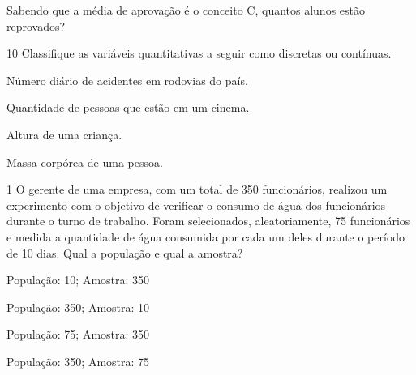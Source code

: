 {\begin{escolha}
\item
  Sabendo que a média de aprovação é o conceito C, quantos alunos estão
  reprovados?

\end{escolha}


\num{10} Classifique as variáveis quantitativas a seguir como discretas
ou contínuas.


\begin{escolha}
\item
  Número diário de acidentes em rodovias do país.


\item
  Quantidade de pessoas que estão em um cinema.


\item
  Altura de uma criança.


\item
  Massa corpórea de uma pessoa.

\end{escolha}



\num{1} O gerente de uma empresa, com um total de 350 funcionários,
realizou um experimento com o objetivo de verificar o consumo de água
dos funcionários durante o turno de trabalho. Foram selecionados,
aleatoriamente, 75 funcionários e medida a quantidade de água consumida
por cada um deles durante o período de 10 dias. Qual a população e qual
a amostra?

\begin{escolha}
\item
  População: 10; Amostra: 350
\item
  População: 350; Amostra: 10
\item
  População: 75; Amostra: 350
\item
  População: 350; Amostra: 75
\end{escolha}

}
